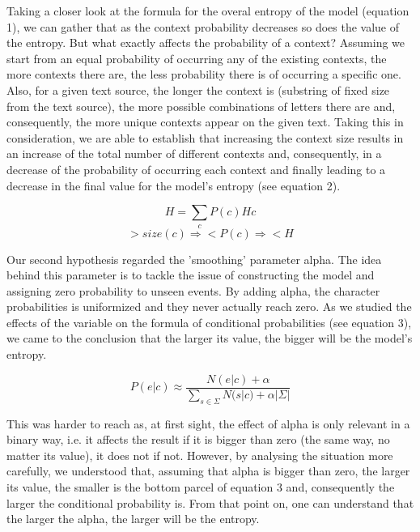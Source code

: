 \documentclass[12pt]{article}
\begin{document}
Taking a closer look at the formula for the overal entropy of the model 
(equation 1), we can gather that as the context probability 
decreases so does the value of the entropy.
But what exactly affects the probability of a context? 
Assuming we start from an equal probability of occurring any of the existing
contexts, the more contexts there are, the less probability there is of 
occurring a specific one.
Also, for a given text source, the longer the context is (substring of fixed 
size from the text source), the more possible combinations of letters there 
are and, consequently, the more unique contexts appear on the given text.
Taking this in consideration, we are able to establish that increasing the 
context size results in an increase of the total number of different contexts
and, consequently, in a decrease of the probability of occurring each context
and finally leading to a decrease in the final value for the model's entropy
(see equation 2).

\begin{equation}
  H = \sum\limits_{c} P(c) Hc
\end{equation}
\begin{equation}
  >size(c) \Rightarrow <P(c) \Rightarrow <H
\end{equation}

Our second hypothesis regarded the 'smoothing' parameter alpha.
The idea behind this parameter is to tackle the issue of constructing the
model and assigning zero probability to unseen events.
By adding alpha, the character probabilities is uniformized and they 
never actually reach zero.
As we studied the effects of the variable on the formula of conditional 
probabilities (see equation 3), we came to the conclusion that the larger
its value, the bigger will be the model's entropy.

\begin{equation}
  P(e|c) \approx \frac{N(e|c) + \alpha}{\sum\limits_{s\in\Sigma}N(s|c) + \alpha|\Sigma|}
\end{equation}

This was harder to reach as, at first sight, the effect of alpha is only 
relevant in a binary way, i.e. it affects the result if it is bigger than 
zero (the same way, no matter its value), it does not if not.
However, by analysing the situation more carefully, we understood that,
assuming that alpha is bigger than zero, the larger its value, the smaller
is the bottom parcel of equation 3 and, consequently the larger the 
conditional probability is.
From that point on, one can understand that the larger the alpha, the larger
will be the entropy.\\
\end{document}
